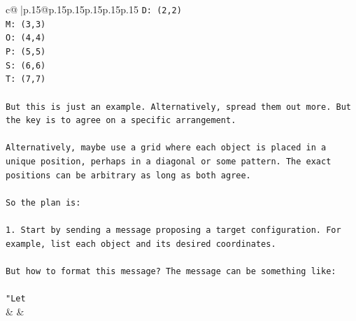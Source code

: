 \documentclass{article}
\begin{document}
{\begin{supertabular}{c@{$\;$}|p{.15\linewidth}@{}p{.15\linewidth}p{.15\linewidth}p{.15\linewidth}p{.15\linewidth}p{.15\linewidth}}
{{{\texttt{D: (2,2)} \\
\texttt{M: (3,3)} \\
\texttt{O: (4,4)} \\
\texttt{P: (5,5)} \\
\texttt{S: (6,6)} \\
\texttt{T: (7,7)} \\
\\ 
\texttt{But this is just an example. Alternatively, spread them out more. But the key is to agree on a specific arrangement.} \\
\\ 
\texttt{Alternatively, maybe use a grid where each object is placed in a unique position, perhaps in a diagonal or some pattern. The exact positions can be arbitrary as long as both agree.} \\
\\ 
\texttt{So the plan is:} \\
\\ 
\texttt{1. Start by sending a message proposing a target configuration. For example, list each object and its desired coordinates.} \\
\\ 
\texttt{But how to format this message? The message can be something like:} \\
\\ 
\texttt{"Let} \\
            }
        }
    }
    & & \\ \\


\end{supertabular}}
\end{document}
